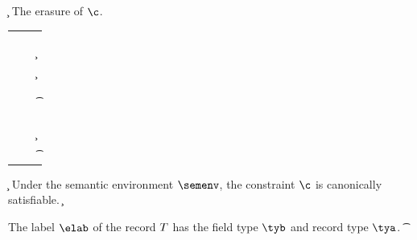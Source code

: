 \documentclass[acmsmall,screen,nonacm%
\Anonymous{,anonymous}{}%
\Final{}{,review}%
]{acmart}
\begin{document}
\begin{judgboxmathpar}
  {\cerase \c}
  {The erasure of $\c$.}
  \label{fig:erasure}
\newcommand{\Erule}[2]{\cerase {#1} &\eqdef& {#2}}
\begin{tabular}{RCL}
  \Erule{\ctrue}{\ctrue} \\
  \Erule{\cfalse}{\cfalse} \\
  \Erule{\ca \cand \cb}{\cerase \ca \cand \cerase \cb} \\
  \Erule{\cexists \tv \c}{\cexists \tv \cerase \c} \\
  \Erule{\cfor \tv \c}{\cfor \tv \cerase \c} \\
  \Erule{\cunif \ta \tb}{\cunif \ta \tb} \\
  \Erule{\clet \x \tv \ca \cb}{\clet \x \tv {\cerase \ca} {\cerase \cb}} \\
  \Erule{\capp \x \t}{\capp \x \t} \\
    \Erule{\cmatch \t {\cbranch {\bar \cpat} {\bar \c}}}{\ctrue} \\
  \Erule{\ueq}{\ueq} \\
  \Erule{\cletr \x \tv \tvs \ca \cb}{\cletr \x \tv \tvs {\cerase \ca} {\cerase \cb}} \\
  \Erule{\cexistsi \inst \x \c}{\cexistsi \inst \x \cerase \c}\\
  \Erule{\cpinst \inst \tv \t}{\cpinst \inst \tv \t}
\end{tabular}
\end{judgboxmathpar}

\begin{judgboxmathpar}
  {\semenv \Th \c}
  {Under the semantic environment $\semenv$,
   the constraint $\c$ is canonically satisfiable.}
  \label{fig:canonical-sem}
    {\semenv \Th \c}

    {\semenv \Th \C\where{\cmatch \t \cbrs}}
\end{judgboxmathpar}

\begin{judgboxmathpar}
  {{\labfrom \elab \T} \leq \tya \to \tyb}
  {The label $\elab$ of the record $T$ has the field type $\tyb$ and record type $\tya$.}
    {{\labfrom \elab \T} \leq \trcd \T \tys \to \t\where{\tvs \is \tys} }
\end{judgboxmathpar}
\end{document}
